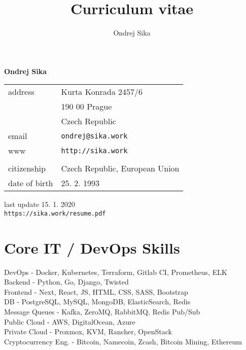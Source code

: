 \documentclass[12pt,a4paper]{article}
\title{Curriculum vitae}
\author{Ondrej Sika}
\begin{document}
\begin{center}
{\LARGE \bf Ondrej Sika}\\
\vspace*{0.2cm}
\begin{tabular}{R{7cm}L{7cm}}
address & Kurta Konrada 2457/6\\
 & 190 00 Prague\\
 & Czech Republic\\
email & \texttt{ondrej@sika.work}\\
www & \texttt{http://sika.work}\\
\\
citizenship & Czech Republic, European Union\\
date of birth & 25. 2. 1993\\
\end{tabular}

\vspace*{0.3cm}
{\hfill last update 15. 1. 2020}\\
{\hfill \texttt{https://sika.work/resume.pdf}}
\end{center}

\section*{Core IT / DevOps Skills}
DevOps - Docker, Kubernetes, Terraform, Gitlab CI, Prometheus, ELK\\
Backend - Python, Go, Django, Twisted\\
Frontend - Next, React, JS, HTML, CSS, SASS, Bootstrap\\
DB - PostgreSQL, MySQL, MongoDB, ElasticSearch, Redis\\
Message Queues - Kafka, ZeroMQ, RabbitMQ, Redis Pub/Sub\\
Public Cloud - AWS, DigitalOcean, Azure\\
Private Cloud - Proxmox, KVM, Rancher, OpenStack\\
Cryptocurrency Eng. - Bitcoin, Namecoin, Zcash, Bitcoin Mining, Ethereum\\
\end{document}
